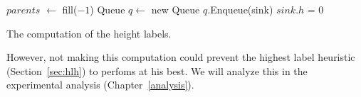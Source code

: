 \begin{algorithm}
$parents$ $\gets$ fill($-1$)\;
Queue $q\gets$ new Queue\;
$q$.Enqueue(sink)\;
$sink.h$ = 0\;

\caption{The computation of the height labels.}
\label{algo:bfsinit}
\end{algorithm}

However, not making this computation could prevent the highest label heuristic (Section~\ref{sec:hlh}) to perfoms at his best. We will analyze this in the experimental analysis (Chapter~\ref{analysis}).






